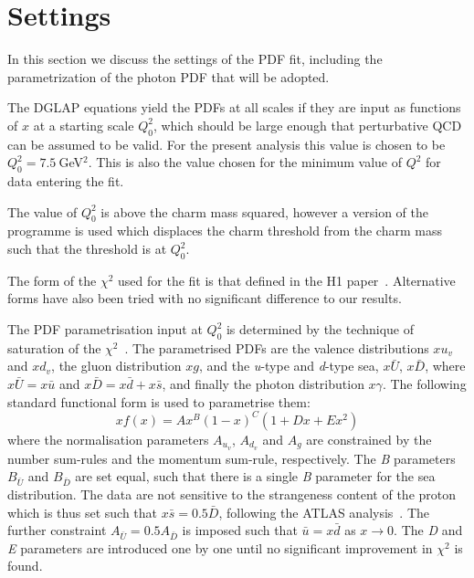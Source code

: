 \section{Settings}
\label{sec:fitsettings}

In this section we discuss the settings of
the PDF fit, including the parametrization of the photon PDF
that will be adopted.


%
The DGLAP equations yield the PDFs at all scales if they are input as functions of $x$ at a starting scale $Q^2_0$, which 
should be large enough that perturbative QCD can be assumed to be valid. For the present analysis this value is chosen
to be $Q^2_0 = 7.5~$GeV$^2$.
%
This is also the value chosen for the minimum value of $Q^2$ for data entering the fit.

The value of $Q^2_0$ is above the charm mass squared, however a version of the programme 
is used which displaces the charm threshold from the charm mass~\cite{charmthresh} such that the threshold is at $Q^2_0$.

%
The form of the $\chi^2$ used for the fit is that defined in the H1 paper~\cite{h1chisqdef}. 
Alternative forms have also been tried with no significant difference to our results.
 
The PDF parametrisation input at $Q^2_0$ is determined by the technique of saturation of the $\chi^{2}$~\cite{h1chisqsat}.
%
The parametrised PDFs are the valence distributions $xu_{v}$ and $xd_{v}$, the gluon distribution $xg$, and the \textit{u}-type and \textit{d}-type sea, $x\bar{U}$, $x\bar{D}$, where $x\bar{U} = x\bar{u}$ and $x\bar{D} = x\bar{d} + x\bar{s}$, and finally the photon distribution $x\gamma$. The following standard functional form is used to parametrise them:
\begin{equation}
xf(x) = Ax^{B}(1-x)^{C}(1+Dx+Ex^{2})
\end{equation}
where the normalisation parameters $A_{u_{v}}$, $A_{d_{v}}$ and $A_{g}$ are constrained by the number sum-rules and the 
momentum sum-rule, respectively. The \textit{B} parameters $B_{\bar{U}}$ and $B_{\bar{D}}$ are set equal, such that there 
is a single \textit{B} parameter for the sea distribution. The data are not sensitive to the 
strangeness content of the proton which is thus set such that $x\bar{s} = 0.5\bar{D}$, following the ATLAS 
analysis~\cite{Aad:2012sb}. The further constraint $A_{\bar{U}} = 0.5 A_{\bar{D}}$ is imposed such that $\bar{u}=x\bar{d}$ as $x \to 0$.
The \textit{D} and \textit{E} parameters are introduced one by one until no significant 
improvement in $\chi^{2}$ is found. 


